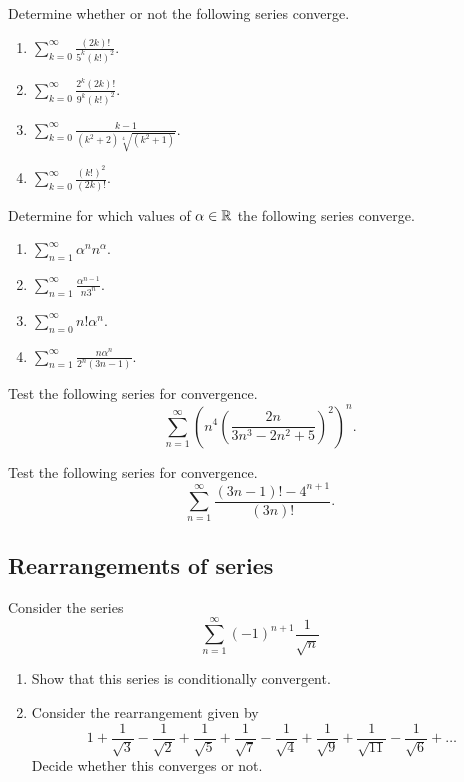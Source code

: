 \documentclass[10pt, a4paper]{article}
\newcommand{\infsum}[1][n = 1]{\sum_{#1}^{\infty}}
\begin{document}
\begin{example}
    Determine whether or not the following series converge.
    \begin{enumerate}[label = \alph*.]
        \item $\displaystyle \infsum[k = 0]\frac{(2k)!}{5 ^ k (k!) ^ 2}.$
        \item $\displaystyle \infsum[k = 0]\frac{2 ^ k (2k)!}{9 ^ k (k!) ^ 2}.$
        \item $\displaystyle \infsum[k = 0]\frac{k - 1}{(k ^ 2 + 2)\sqrt[4]{(k ^ 2 + 1)}}.$
        \item $\displaystyle \infsum[k = 0]\frac{(k!) ^ 2}{(2k)!}.$
    \end{enumerate}
\end{example}

\begin{example}
    Determine for which values of $\alpha \in \mathbb{R}$ the following series converge.
    \begin{enumerate}[label = \alph*.]
        \item $\displaystyle \infsum\alpha ^ n n ^ \alpha.$
        \item $\displaystyle \infsum\frac{\alpha ^ {n - 1}}{n 3 ^ n}.$
        \item $\displaystyle \infsum[n = 0] n! \alpha ^ n.$
        \item $\displaystyle \infsum\frac{n \alpha ^ n}{2 ^ n (3n - 1)}.$
    \end{enumerate}
\end{example}

\begin{example}
    Test the following series for convergence.
    \[
    \infsum \left(n ^ 4\left(\frac{2n}{3n ^ 3 - 2n ^ 2 + 5}\right) ^ 2\right) ^ n.
    \]
\end{example}

\begin{example}
    Test the following series for convergence.
    \[
    \infsum \frac{(3n - 1)! - 4 ^ {n + 1}}{(3n)!}.
    \]
\end{example}

\subsection{Rearrangements of series}

\begin{example}
    Consider the series
    \[
    \infsum (-1)^{n + 1} \frac{1}{\sqrt{n}}
    \]
    \begin{enumerate}[label = \alph*.]
        \item Show that this series is conditionally convergent.
        \item Consider the rearrangement given by
        \[
        1 + \frac{1}{\sqrt{3}} - \frac{1}{\sqrt{2}} + \frac{1}{\sqrt{5}} + \frac{1}{\sqrt{7}} - \frac{1}{\sqrt{4}} + \frac{1}{\sqrt{9}} + \frac{1}{\sqrt{11}} - \frac{1}{\sqrt{6}} + \dotsc
        \]
        Decide whether this converges or not.
    \end{enumerate}
\end{example}
\end{document}
